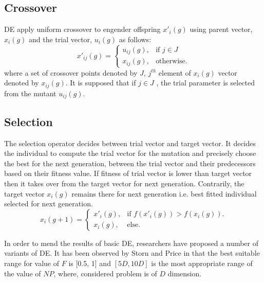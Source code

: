 \documentclass{svproc}
\begin{document}
\subsection{Crossover}
DE apply uniform crossover to engender offspring $x'_i(g)$ using parent vector, $x_i(g)$ and the trial vector, $u_i(g)$ as follows:
\begin{equation}
    x'_{ij}(g)=\begin{cases}
                    u_{ij}(g), &  \mbox{if } j\in J\\
                    x_{ij}(g), & \mbox{otherwise}.
                \end{cases}
\end{equation}
where a set of crossover points denoted by $J$, $j^{th}$ element of $x_i(g)$ vector denoted by $x_{ij}(g)$. It is supposed that if $j\in J $ , the trial parameter is selected from the mutant $u_{ij}(g)$.

\subsection{Selection}

The selection operator decides between trial vector and target vector. It decides the individual to compute the trial vector for the mutation and precisely choose the best for the next generation, between the trial vector and their predecessors based on their fitness value. If fitness of trial vector is lower than target vector then it takes over from the target vector for next generation. Contrarily, the target vector $x_{i}(g)$ remains there for next generation i.e. best fitted individual selected for next generation.
\begin{equation*}
    x_{i}(g+1)=\begin{cases}
                    x'_{i}(g), &  \mbox{if } f( x'_{i}(g))>f(x_{i}(g)).\\
                    x_{i}(g), & \mbox{else}.
                \end{cases}
\end{equation*}

In order to mend the results of basic DE, researchers have proposed a number of variants of DE. It has been observed by Storn and Price in \cite{price1996differential} that the best suitable range for value of $F$ is [0.5, 1] and $[5D, 10D]$ is the most appropriate range of the value of $NP$, where, considered problem is of $D$ dimension.
\end{document}
